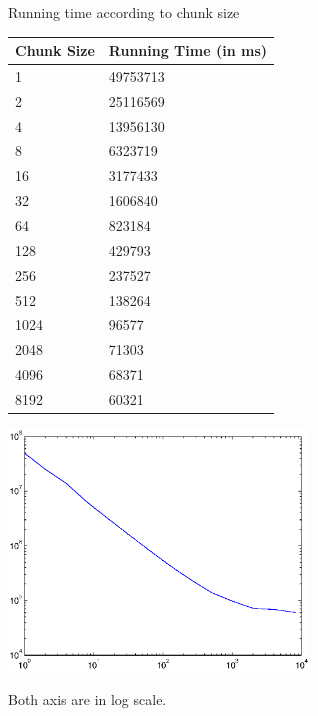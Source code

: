 \documentclass[letterpaper,10pt,twocolumn,titlepage]{article}
\begin{document}
Running time according to chunk size

\begin{table}[!htp]
    \begin{tabular}{|l|l|}
        \hline
        Chunk Size & Running Time (in ms) \\ \hline
        1 & 49753713 \\ \hline
        2 & 25116569 \\ \hline
        4 & 13956130 \\ \hline
        8 & 6323719 \\ \hline
        16 & 3177433 \\ \hline
        32 & 1606840 \\ \hline
        64 & 823184 \\ \hline
        128 & 429793 \\ \hline
        256 & 237527 \\ \hline
        512 & 138264 \\ \hline
        1024 & 96577 \\ \hline
        2048 & 71303 \\ \hline
        4096 & 68371 \\ \hline
        8192 & 60321 \\
        \hline
    \end{tabular}
\end{table}

\includegraphics [width=0.6\textwidth]{cs311_1.eps}

Both axis are in log scale.
\end{document}
